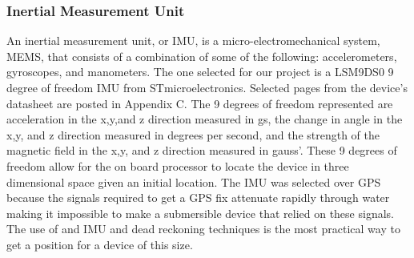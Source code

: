 \documentclass{report}
\begin{document}
\subsubsection{Inertial Measurement Unit}
An inertial measurement unit, or IMU, is a micro-electromechanical system, MEMS, that consists of a combination of some of the following: accelerometers, gyroscopes, and manometers. The one selected for our project is a LSM9DS0 9 degree of freedom IMU from STmicroelectronics. Selected pages from the device's datasheet are posted in Appendix C. The 9 degrees of freedom represented are acceleration in the x,y,and z direction measured in gs, the change in angle in the x,y, and z direction measured in degrees per second, and the strength of the magnetic field in the x,y, and z direction measured in gauss'. These 9 degrees of freedom allow for the on board processor to locate the device in three dimensional space given an initial location. The IMU was selected over GPS because the signals required to get a GPS fix attenuate rapidly through water making it impossible to make a submersible device that relied on these signals. The use of and IMU and dead reckoning techniques is the most practical way to get a position for a device of this size. 
\end{document}
